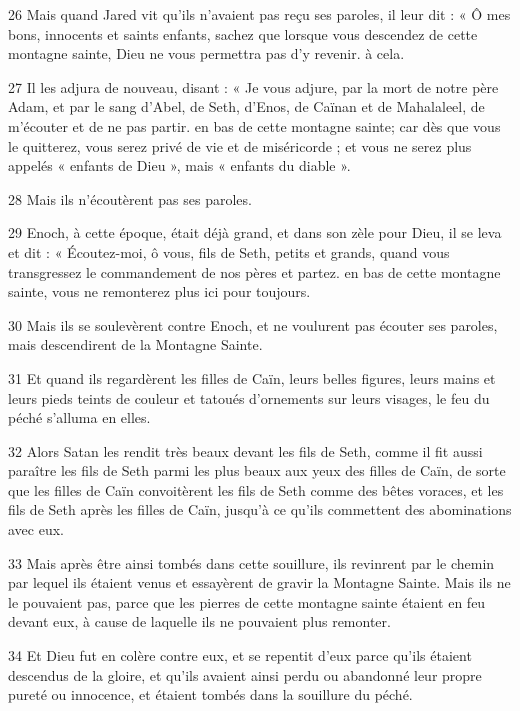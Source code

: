 \par 26 Mais quand Jared vit qu'ils n'avaient pas reçu ses paroles, il leur dit : « Ô mes bons, innocents et saints enfants, sachez que lorsque vous descendez de cette montagne sainte, Dieu ne vous permettra pas d'y revenir. à cela.

\par 27 Il les adjura de nouveau, disant : « Je vous adjure, par la mort de notre père Adam, et par le sang d'Abel, de Seth, d'Enos, de Caïnan et de Mahalaleel, de m'écouter et de ne pas partir. en bas de cette montagne sainte; car dès que vous le quitterez, vous serez privé de vie et de miséricorde ; et vous ne serez plus appelés « enfants de Dieu », mais « enfants du diable ».

\par 28 Mais ils n'écoutèrent pas ses paroles.

\par 29 Enoch, à cette époque, était déjà grand, et dans son zèle pour Dieu, il se leva et dit : « Écoutez-moi, ô vous, fils de Seth, petits et grands, quand vous transgressez le commandement de nos pères et partez. en bas de cette montagne sainte, vous ne remonterez plus ici pour toujours.

\par 30 Mais ils se soulevèrent contre Enoch, et ne voulurent pas écouter ses paroles, mais descendirent de la Montagne Sainte.

\par 31 Et quand ils regardèrent les filles de Caïn, leurs belles figures, leurs mains et leurs pieds teints de couleur et tatoués d'ornements sur leurs visages, le feu du péché s'alluma en elles.

\par 32 Alors Satan les rendit très beaux devant les fils de Seth, comme il fit aussi paraître les fils de Seth parmi les plus beaux aux yeux des filles de Caïn, de sorte que les filles de Caïn convoitèrent les fils de Seth comme des bêtes voraces, et les fils de Seth après les filles de Caïn, jusqu'à ce qu'ils commettent des abominations avec eux.

\par 33 Mais après être ainsi tombés dans cette souillure, ils revinrent par le chemin par lequel ils étaient venus et essayèrent de gravir la Montagne Sainte. Mais ils ne le pouvaient pas, parce que les pierres de cette montagne sainte étaient en feu devant eux, à cause de laquelle ils ne pouvaient plus remonter.

\par 34 Et Dieu fut en colère contre eux, et se repentit d'eux parce qu'ils étaient descendus de la gloire, et qu'ils avaient ainsi perdu ou abandonné leur propre pureté ou innocence, et étaient tombés dans la souillure du péché.

